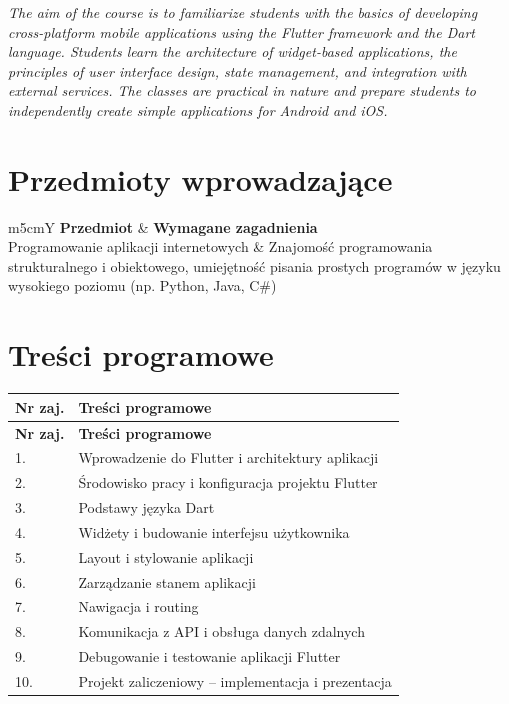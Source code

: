 \documentclass[12pt, a4paper]{article}
\newcommand{\thdrule}{\noalign{\global\setlength{\extrarowheight}{0pt}}}
\newcommand{\thdend}{\noalign{\global\setlength{\extrarowheight}{3pt}}}
\begin{document}
\textit{The aim of the course is to familiarize students with the basics of developing cross-platform mobile applications using the Flutter framework and the Dart language. Students learn the architecture of widget-based applications, the principles of user interface design, state management, and integration with external services. The classes are practical in nature and prepare students to independently create simple applications for Android and iOS.}


\section{Przedmioty wprowadzające}

{\scriptsize
\begin{tabularx}{\textwidth}{m{5cm}Y}
\thdrule\toprule
{} {\color{white}\textbf{Przedmiot}} & {\color{white}\textbf{Wymagane zagadnienia}} \\
\midrule\thdend
   Programowanie aplikacji internetowych & Znajomość programowania strukturalnego i obiektowego, umiejętność pisania prostych programów w języku wysokiego poziomu (np. Python, Java, C\#) \\
\bottomrule
\end{tabularx}}

\section{Treści programowe}

{\scriptsize
\begin{longtable}{m{1.5cm}m{14.5cm}}
\thdrule\toprule
\rowcolor{pjatkRed} {\color{white}\textbf{Nr zaj.}} & {\color{white}\textbf{Treści programowe}} \\
\midrule\thdend
\endfirsthead
\thdrule\toprule
\rowcolor{pjatkRed} {\color{white}\textbf{Nr zaj.}} & {\color{white}\textbf{Treści programowe}} \\
\midrule\thdend
\endhead
  \rowcolor{tableRowLight} 1. & Wprowadzenie do Flutter i architektury aplikacji \\
  \rowcolor{tableRowAlt} 2. & Środowisko pracy i konfiguracja projektu Flutter \\
  \rowcolor{tableRowLight} 3. & Podstawy języka Dart \\
  \rowcolor{tableRowAlt} 4. & Widżety i budowanie interfejsu użytkownika \\
  \rowcolor{tableRowLight} 5. & Layout i stylowanie aplikacji \\
  \rowcolor{tableRowAlt} 6. & Zarządzanie stanem aplikacji \\
  \rowcolor{tableRowLight} 7. & Nawigacja i routing \\
  \rowcolor{tableRowAlt} 8. & Komunikacja z API i obsługa danych zdalnych \\
  \rowcolor{tableRowLight} 9. & Debugowanie i testowanie aplikacji Flutter \\
  \rowcolor{tableRowAlt} 10. & Projekt zaliczeniowy – implementacja i prezentacja \\
\bottomrule
\end{longtable}}
\end{document}
